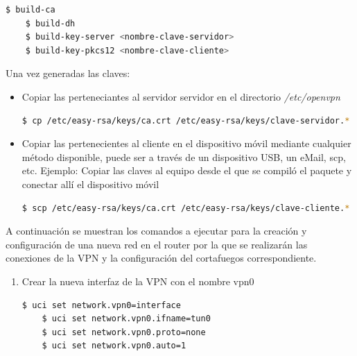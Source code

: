 \documentclass[12pt, twoside]{article}
\begin{document}
\begin{enumerate}
                    \begin{lstlisting}[language=bash]
    $ build-ca
    $ build-dh
    $ build-key-server <nombre-clave-servidor>
    $ build-key-pkcs12 <nombre-clave-cliente>
                    \end{lstlisting}

                    Una vez generadas las claves:
                    
                        \begin{itemize}

                            \item Copiar las perteneciantes al servidor servidor en el directorio \textit{/etc/openvpn}
                            \begin{lstlisting}[language=bash]
    $ cp /etc/easy-rsa/keys/ca.crt /etc/easy-rsa/keys/clave-servidor.* /etc/easy-rsa/keys/dh2048.pem /etc/openvpn
                            \end{lstlisting}

                            \item Copiar las pertenecientes al cliente en el dispositivo móvil mediante cualquier método disponible, puede ser a través de un dispositivo USB, un eMail, scp, etc.
                            Ejemplo: Copiar las claves al equipo desde el que se compiló el paquete y conectar allí el dispositivo móvil
                            \begin{lstlisting}[language=bash]
    $ scp /etc/easy-rsa/keys/ca.crt /etc/easy-rsa/keys/clave-cliente.* root@192.168.0.100:/etc/openvpn
                            \end{lstlisting}
                        \end{itemize}   
                    
                    A continuación se muestran los comandos a ejecutar para la creación y configuración de una nueva red en el router por la que se realizarán las conexiones de la VPN y la configuración del cortafuegos correspondiente.

                    \begin{enumerate}
                        \item Crear la nueva interfaz de la VPN con el nombre vpn0
                            
                        \begin{lstlisting}[language=bash]
    $ uci set network.vpn0=interface
    $ uci set network.vpn0.ifname=tun0
    $ uci set network.vpn0.proto=none
    $ uci set network.vpn0.auto=1        
                        \end{lstlisting}


\end{enumerate}
\end{enumerate}
\end{document}
